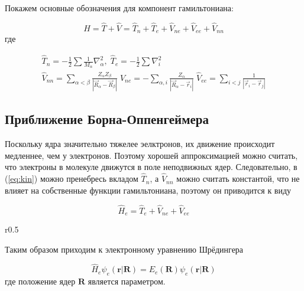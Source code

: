 \documentclass[12pt, oneside]{article}
\numberwithin{equation}{section}  %
\begin{document}
Покажем основные обозначения для компонент гамильтониана:

\begin{equation}
    \hat{H} = \hat{T} + \hat{V} = \hat{T}_n + \hat{T}_e + \hat{V}_{ne} + \hat{V}_{ee} + \hat{V}_{nn}
\end{equation}
где 


\begin{gather}
\label{eq:kin}
\hat{T}_n = - \frac{1}{2} \sum \frac{1}{M_\alpha} \nabla_\alpha^2,\; \hat{T}_e = - \frac{1}{2} \sum \nabla_i^2 \\
\hat{V}_{nn} = \sum_{\alpha < \beta} \frac{Z_\alpha Z_\beta}{|\vec{R}_\alpha - \vec{R}_\beta|} \;
\hat{V}_{ne} = - \sum_{\alpha, i} \frac{Z_\alpha}{|\vec{R}_\alpha - \vec{r}_i|} \;
\hat{V}_{ee} = \sum_{i < j} \frac{1}{|\vec{r}_i - \vec{r}_j|}
\end{gather}

\subsection{Приближение Борна-Оппенгеймера}

Поскольку ядра значительно тяжелее эелктронов, их движение происходит медленнее, чем у электронов. Поэтому хорошей аппроксимацией можно считать, что электроны в молекуле движутся в поле неподвижных ядер. Следовательно, в (\ref{eq:kin}) можно пренебресь вкладом \(\hat{T}_n\), а \(\hat{V}_{nn}\) можно считать константой, что не влияет на собственные функции гамильтониана, поэтому он приводится к виду

\begin{equation}
    \hat{H}_e = \hat{T}_e + \hat{V}_{ne} + \hat{V}_{ee}
    \label{eq:H_e}
\end{equation}

\begin{wrapfigure}{r}{0.5\textwidth}
  \centering
\end{wrapfigure}



Таким образом приходим к электронному уравнению Шрёдингера

\begin{equation}
    \hat{H}_e \psi_e (\bm{r}| \bm{R} ) = E_e (\bm{R}) \psi_e (\bm{r}| \bm{R})
\end{equation}
где положение ядер \(\bm{R}\) является параметром.
\end{document}
